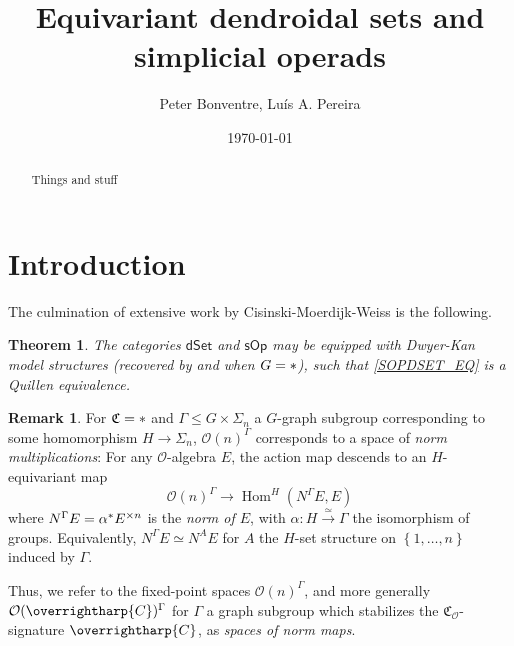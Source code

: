 \documentclass[a4paper,10pt
,draft
]{article}%
\title{Equivariant dendroidal sets and simplicial operads}
\author{Peter Bonventre, Lu\'is A. Pereira}%
\date{\today}
\numberwithin{equation}{section}
\numberwithin{figure}{section}
\newtheorem{theorem}[equation]{Theorem}%
\theoremstyle{definition} %
\newtheorem{remark}[equation]{Remark}%
\newcommand{\set}[1]{\left\{#1\right\}}%
\newcommand{\longto}{\longrightarrow}%
\newcommand{\vect}[1]{\text{\overrightharp{\ensuremath{#1}}}}
\newcommand{\sOp}{\ensuremath{\mathsf{sOp}}}%
\newcommand{\dSet}{\mathsf{dSet}}
\DeclareMathOperator{\Hom}{Hom}%
\renewcommand{\O}{\ensuremath{\mathcal O}}
\newcommand{\1}{\ensuremath{\mathbbm 1}}%
\begin{document}
\maketitle

\begin{abstract}
      Things and stuff
\end{abstract}

\tableofcontents


\section{Introduction}



The culmination of extensive work by Cisinski-Moerdijk-Weiss \cite{CM13a,CM13b,CM11,MW09,MW07} is the following.

\begin{theorem}
      \label{CMW_THM}
      The categories $\dSet$ and $\sOp$ may be equipped with Dwyer-Kan model structures
      (recovered by \cite[Thm. 2.1]{Per18} and \cite[Thm III]{BP_HGOP}  when $G = \**$),
      such that \eqref{SOPDSET_EQ} is a Quillen equivalence.
\end{theorem}


{\color{OliveGreen} %
  \begin{remark}
        For $\mathfrak C = \**$ and $\Gamma \leq G \times \Sigma_n$ a $G$-graph subgroup corresponding to some homomorphism $H \to \Sigma_n$,
        $\O(n)^{\Gamma}$ corresponds to a space of \textit{norm multiplications}:
        For any $\O$-algebra $E$, the action map descends to an $H$-equivariant map
        \[
              \O(n)^{\Gamma} \longto \Hom^H(N^\Gamma E, E)
        \]
        where $N^\Gamma E = \alpha^{\**}E^{\times n}$ is the \textit{norm of $E$}, with $\alpha \colon H \xrightarrow{\simeq} \Gamma$ the isomorphism of groups.
        Equivalently, $N^\Gamma E \simeq N^A E$ for $A$ the $H$-set structure on $\set{1,\dots, n}$ induced by $\Gamma$.

        Thus, we refer to the fixed-point spaces $\O(n)^\Gamma$,
        and more generally $\O(\vect C)^\Gamma$ for $\Gamma$ a graph subgroup which stabilizes the $\mathfrak C_\O$-signature $\vect C$,
        as \textit{spaces of norm maps}.
  \end{remark}
} %
\end{document}
